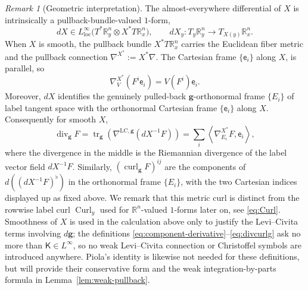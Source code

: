\documentclass[11pt,reqno]{amsart}
\theoremstyle{plain}
\theoremstyle{definition}
\theoremstyle{remark}
\newtheorem{remark}[theorem]{Remark}
\numberwithin{equation}{section}
\DeclareMathOperator{\Div}{div}
\DeclareMathOperator{\curl}{curl}
\DeclareMathOperator{\Curl}{Curl}
\DeclareMathOperator{\tr}{tr}
\newcommand{\Kmat}{\mathsf K}
\newcommand{\eframe}{\mathsf e}   %
\newcommand{\gmetric}{\mathbf g}
\newcommand{\Real}{\mathbb R}
\newcommand{\Rn}{\Real^n}
\begin{document}
\begin{remark}[Geometric interpretation]
The almost-everywhere differential of $X$ is intrinsically a
pullback-bundle-valued $1$-form,
\[
 dX\in L^\infty_{\mathrm{loc}}\big(
 T^*\Real_y^n\otimes X^*T\Real_x^n\big),
 \qquad
 dX_y:T_y\Real_y^n\longrightarrow T_{X(y)}\Real_x^n.
\]
When $X$ is smooth, the pullback bundle $X^*T\Real_x^n$ carries the
Euclidean fiber metric and the pullback connection
$\nabla^{X^*}:=X^*\nabla$. The Cartesian frame $\{\eframe_i\}$ along $X$, is parallel, so
\[
 \nabla^{X^*}_V(F^i\eframe_i)=V(F^i)\eframe_i.
\]
Moreover, $dX$ identifies the genuinely pulled-back $\gmetric$-orthonormal frame $\{E_i\}$ of
label tangent space with the orthonormal Cartesian frame
$\{\eframe_i\}$ along $X$.  Consequently for smooth $X$,
\[
 \Div_{\gmetric}F
 =\tr_{\gmetric} \left(
   \nabla^{\mathrm{LC},\gmetric}(dX^{-1}F)\right)
 =\sum_i\left\langle
    \nabla^{X^*}_{E_i}F,\eframe_i
   \right\rangle,
\]
where the divergence in the middle is the Riemannian divergence of the label
vector field $dX^{-1}F$.  Similarly,
$(\curl_{\gmetric}F)^{ij}$ are the components of
$d((dX^{-1}F)^\flat)$ in the orthonormal frame $\{E_i\}$, with the two
Cartesian indices displayed up as fixed above. We remark that this metric curl is distinct from the rowwise label curl
$\Curl_y$ used for $\Rn$-valued $1$-forms later on, see \eqref{eq:Curl}.  Smoothness of $X$ is used in the calculation above only to justify the Levi--Civita terms involving
$d\gmetric$; the definitions
\eqref{eq:component-derivative}--\eqref{eq:divcurlg} ask no more than
$\Kmat\in L^\infty$, so no weak Levi--Civita connection or Christoffel symbols
are introduced anywhere.  Piola's identity is likewise not needed for these definitions, but will
provide their conservative form and the weak integration-by-parts
formula in Lemma~\ref{lem:weak-pullback}.
\end{remark}
\end{document}
